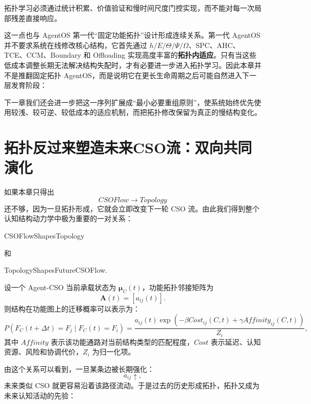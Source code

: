 拓扑学习必须通过统计积累、价值验证和慢时间尺度门控实现，而不能对每一次局部残差直接响应。

这一点也与 AgentOS 第一代``固定功能拓扑''设计形成连续关系。第一代 AgentOS 并不要求系统在线修改核心结构，它首先通过 $h/E/\Theta/\Psi/\Omega$、SPC、AHC、TCE、CCM、Boundary 和 Offloading 实现高度丰富的\textbf{拓扑内适应}。只有当这些低成本调整长期无法解决结构失配时，才有必要进一步进入拓扑学习。因此本章并不是推翻固定拓扑 AgentOS，而是说明它在更长生命周期之后可能自然进入下一层发育阶段：
\begin{statementbox}
\centering
{}
\end{statementbox}

下一章我们还会进一步把这一序列扩展成``最小必要重组原则''，使系统始终优先使用较浅、较可逆、较低成本的适应机制，而把拓扑修改保留为真正的慢结构变化。


\section{拓扑反过来塑造未来CSO流：双向共同演化}

如果本章只得出
\[
CSOFlow\rightarrow Topology
\]
还不够，因为一旦拓扑形成，它就会立即改变下一轮 CSO 流。由此我们得到整个认知结构动力学中极为重要的一对关系：
\begin{statementbox}
CSOFlowShapesTopology
\end{statementbox}
和
\begin{statementbox}
TopologyShapesFutureCSOFlow.
\end{statementbox}

设一个 Agent-CSO 当前承载状态为 $\boldsymbol{\mu}_C(t)$，功能拓扑邻接矩阵为
\[
\mathbf{A}(t)
=
[a_{ij}(t)].
\]
则结构在功能图上的迁移概率可以表示为：
\[
P
\left(
F_C(t+\Delta t)=F_j
\mid
F_C(t)=F_i
\right)
=
\frac{
a_{ij}(t)
\exp
\left(
-\beta Cost_{ij}(C,t)
+\gamma Affinity_{ij}(C,t)
\right)
}{
Z_i
},
\]
其中 $Affinity$ 表示该功能通路对当前结构类型的匹配程度，$Cost$ 表示延迟、认知资源、风险和协调代价，$Z_i$ 为归一化项。

由这个关系可以看到，一旦某条边被长期强化：
\[
a_{ij}\uparrow,
\]
未来类似 CSO 就更容易沿着该路径流动。于是过去的历史形成拓扑，拓扑又成为未来认知活动的先验：
\begin{statementbox}
\centering
{}
\end{statementbox}

